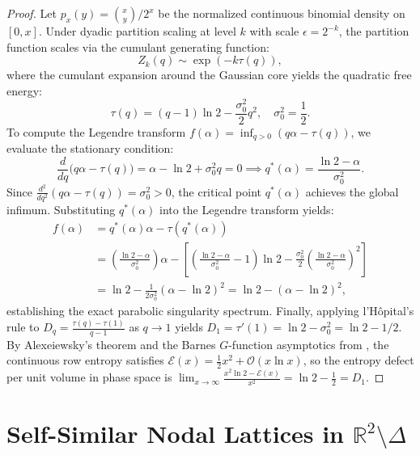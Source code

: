 \documentclass[11pt,a4paper]{article}
\theoremstyle{plain}
\theoremstyle{definition}
\theoremstyle{remark}
\numberwithin{equation}{section}
\begin{document}
\begin{proof}
Let $p_x(y) = \binom{x}{y}/2^x$ be the normalized continuous binomial density on $[0, x]$. Under dyadic partition scaling at level $k$ with scale $\epsilon = 2^{-k}$, the partition function scales via the cumulant generating function:
\begin{equation}
Z_k(q) \sim \exp\left( -k \tau(q) \right),
\end{equation}
where the cumulant expansion around the Gaussian core yields the quadratic free energy:
\begin{equation}
\tau(q) = (q - 1)\ln 2 - \frac{\sigma_0^2}{2}q^2, \quad \sigma_0^2 = \frac{1}{2}.
\end{equation}
To compute the Legendre transform $f(\alpha) = \inf_{q > 0}(q\alpha - \tau(q))$, we evaluate the stationary condition:
\begin{equation}
\frac{d}{dq}\Big(q\alpha - \tau(q)\Big) = \alpha - \ln 2 + \sigma_0^2 q = 0 \implies q^*(\alpha) = \frac{\ln 2 - \alpha}{\sigma_0^2}.
\end{equation}
Since $\frac{d^2}{dq^2}(q\alpha - \tau(q)) = \sigma_0^2 > 0$, the critical point $q^*(\alpha)$ achieves the global infimum. Substituting $q^*(\alpha)$ into the Legendre transform yields:
\begin{align}
f(\alpha) &= q^*(\alpha)\alpha - \tau(q^*(\alpha)) \nonumber \\
&= \left(\frac{\ln 2 - \alpha}{\sigma_0^2}\right)\alpha - \left[ \left(\frac{\ln 2 - \alpha}{\sigma_0^2} - 1\right)\ln 2 - \frac{\sigma_0^2}{2}\left(\frac{\ln 2 - \alpha}{\sigma_0^2}\right)^2 \right] \nonumber \\
&= \ln 2 - \frac{1}{2\sigma_0^2}(\alpha - \ln 2)^2 = \ln 2 - (\alpha - \ln 2)^2,
\end{align}
establishing the exact parabolic singularity spectrum. Finally, applying l'H\^opital's rule to $D_q = \frac{\tau(q) - \tau(1)}{q-1}$ as $q \to 1$ yields $D_1 = \tau'(1) = \ln 2 - \sigma_0^2 = \ln 2 - 1/2$. By Alexeiewsky's theorem and the Barnes $G$-function asymptotics from \cite{silvafilho2026simplex, barnes1900}, the continuous row entropy satisfies $\mathcal{E}(x) = \frac{1}{2}x^2 + \mathcal{O}(x\ln x)$, so the entropy defect per unit volume in phase space is $\lim_{x\to\infty} \frac{x^2\ln 2 - \mathcal{E}(x)}{x^2} = \ln 2 - \frac{1}{2} = D_1$.
\end{proof}

\section[Self-Similar Nodal Lattices outside the Simplex]{Self-Similar Nodal Lattices in \texorpdfstring{$\mathbb{R}^2 \setminus \Delta$}{R\textasciicircum 2 \textbackslash{} Delta}}
\end{document}

